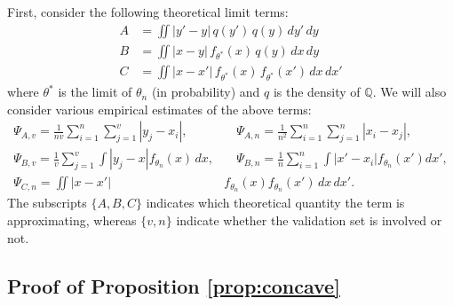 \documentclass[11pt,a4paper]{article}
\theoremstyle{plain}
\theoremstyle{remark}
\theoremstyle{remark}
\begin{document}
First, consider the following theoretical limit terms:
\begin{align*}
    A&=\iint |y'-y|\, q(y')\, q(y) \,dy'\,dy\\
    B&=\iint |x-y|\, f_{\theta^*}(x)\,q(y) \,dx \, dy\\
    C&=\iint |x-x'|\,f_{\theta^*}(x)\,f_{\theta^*}(x')\, dx\,dx'
    \end{align*}
where $\theta^*$ is the limit of $\theta_n$ (in probability) and $q$ is the density of $\mathbb{Q}$. We will also consider various empirical estimates of the above terms:
    \begin{align*}
    \Psi_{A,v}=\frac{1}{n v}\sum_{i=1}^n \sum_{j = 1}^v |y_j-x_i|, &\quad 
     \Psi_{A,n} =\frac{1}{n^2}\sum_{i =1}^{n} \sum_{j = 1} ^{n}|x_i-x_j|,\\
    \Psi_{B,v}=\frac{1}{v}\sum_{j = 1}^v\int |y_j-x|f_{\theta_n}(x)\, dx, &\quad 
        \Psi_{B,n}=\frac{1}{n}\sum_{i=1}^{n} \int |x'-x_i| f_{\theta_{n}}(x') dx',\\
    \Psi_{C,n} =\iint |x-x'| &f_{\theta_{n}}(x) f_{\theta_{n}}(x')\, dx \, dx'.
\end{align*}
The subscripts $\{A,B,C\}$ indicates which theoretical quantity the term is approximating, whereas $\{v, n\}$ indicate whether the validation set is involved or not.

\subsection{Proof of Proposition \ref{prop:concave}}
\end{document}
